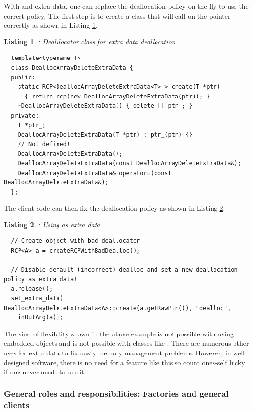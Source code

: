 \documentclass[pdf,ps2pdf,11pt]{SANDreport}
\newtheorem{listing}{Listing}
\begin{document}
With {} and extra data, one can replace the deallocation
policy on the fly to use the correct policy.  The first step is to
create a class that will call {} on the pointer
correctly as shown in Listing
{}\ref{listing:DeallocArrayDeleteExtraData}.

\begin{listing}: Dealllocator class for extra data deallocation \\
\label{listing:DeallocArrayDeleteExtraData}
{\small\begin{verbatim}
  template<typename T>
  class DeallocArrayDeleteExtraData {
  public:
    static RCP<DeallocArrayDeleteExtraData<T> > create(T *ptr)
      { return rcp(new DeallocArrayDeleteExtraData(ptr)); }
    ~DeallocArrayDeleteExtraData() { delete [] ptr_; }
  private:
    T *ptr_;
    DeallocArrayDeleteExtraData(T *ptr) : ptr_(ptr) {}
    // Not defined!
    DeallocArrayDeleteExtraData();
    DeallocArrayDeleteExtraData(const DeallocArrayDeleteExtraData&);
    DeallocArrayDeleteExtraData& operator=(const DeallocArrayDeleteExtraData&);
  };
\end{verbatim}}
\end{listing}

The client code can then fix the deallocation policy as shown in
Listing {}\ref{listing:using-DeallocArrayDeleteExtraData}.

\begin{listing}: Using {} as extra data \\
\label{listing:using-DeallocArrayDeleteExtraData}
{\small\begin{verbatim}
  // Create object with bad deallocator
  RCP<A> a = createRCPWithBadDealloc();

  // Disable default (incorrect) dealloc and set a new deallocation policy as extra data!
  a.release();
  set_extra_data( DeallocArrayDeleteExtraData<A>::create(a.getRawPtr()), "dealloc",
    inOutArg(a));
\end{verbatim}}
\end{listing}

The kind of flexibility shown in the above example is not possible
with using embedded objects and is not possible with classes like
{}.  There are numerous other uses for extra
data to fix nasty memory management problems.  However, in well
designed software, there is no need for a feature like this so count
ones-self lucky if one never needs to use it.


%
{}\subsubsection{General roles and responsibilities: Factories and
general clients}
%
\end{document}
